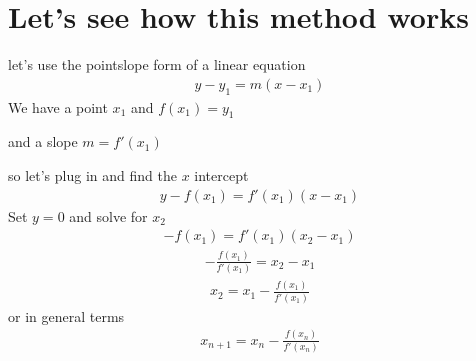 \documentclass[letterpaper,10pt,english]{jupyterBook}
\begin{document}
\chapter{Let’s see how this method works}
\label{\detokenize{testNewton-outdatewarning:let-s-see-how-this-method-works}}
\sphinxAtStartPar
let’s use the point\sphinxhyphen{}slope form of a linear equation
\begin{equation*}
\begin{split}
y - y_1 = m(x - x_1)
\end{split}
\end{equation*}
\sphinxAtStartPar
We have a point \(x_1\) and \(f(x_1)=y_1\)

\sphinxAtStartPar
and a slope \(m= f'(x_1)\)

\sphinxAtStartPar
so let’s plug in and find the \(x\) intercept
\begin{equation*}
\begin{split}
y - f(x_1) = f'(x_1)(x - x_1)
\end{split}
\end{equation*}
\sphinxAtStartPar
Set \(y=0\) and solve for \(x_2\)
\begin{equation*}
\begin{split}
 - f(x_1) = f'(x_1)(x_2 - x_1)
\end{split}
\end{equation*}\begin{equation*}
\begin{split}
-\frac{f(x_1)}{f'(x_1)} = x_2 - x_1
\end{split}
\end{equation*}\begin{equation*}
\begin{split}
x_2 = x_1 - \frac{f(x_1)}{f'(x_1)}
\end{split}
\end{equation*}
\sphinxAtStartPar
or in general terms
\begin{equation*}
\begin{split}
x_{n+1} = x_n - \frac{f(x_n)}{f'(x_n)}
\end{split}
\end{equation*}
\end{document}
